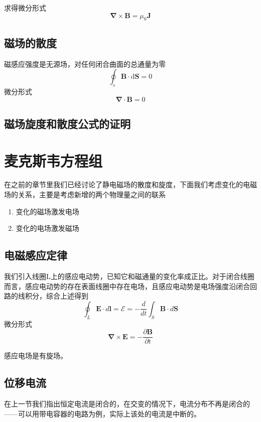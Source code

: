 		求得微分形式
		\begin{equation}
			\boldsymbol{\nabla} \times \boldsymbol{B}=\mu_{0} \boldsymbol{J}
		\end{equation}
	\subsection{磁场的散度}
		磁感应强度是无源场，对任何闭合曲面的总通量为零
		\begin{equation}
			\oint_{s} \boldsymbol{B} \cdot \mathrm{d} \boldsymbol{S}=0
		\end{equation}
		微分形式
		\begin{equation}
			\boldsymbol{\nabla} \cdot \boldsymbol{B}=0
		\end{equation}
	\subsection{磁场旋度和散度公式的证明}
\section{麦克斯韦方程组}
	在之前的章节里我们已经讨论了静电磁场的散度和旋度，下面我们考虑变化的电磁场的关系，主要是考虑新增的两个物理量之间的联系
	\begin{enumerate}
	\item 变化的磁场激发电场
	\item 变化的电场激发磁场
	\end{enumerate}

	\subsection{电磁感应定律}
		我们引入线圈L上的感应电动势，已知它和磁通量的变化率成正比。对于闭合线圈而言，感应电动势的存在表面线圈中存在电场，且感应电动势是电场强度沿闭合回路的线积分，综合上述得到
		\begin{equation}
			\oint_{L} \boldsymbol{E} \cdot d \boldsymbol{l}=\mathscr{E}= -\frac{d}{d t} \int_{S} \boldsymbol{B} \cdot d\boldsymbol{S}
		\end{equation}
		微分形式
		\begin{equation}
			\boldsymbol{\nabla} \times \boldsymbol{E}=-\frac{\partial \boldsymbol{B}}{\partial t}
		\end{equation}

		感应电场是有旋场。
	\subsection{位移电流}
		在上一节我们指出恒定电流是闭合的，在交变的情况下，电流分布不再是闭合的——可以用带电容器的电路为例，实际上该处的电流是中断的。

